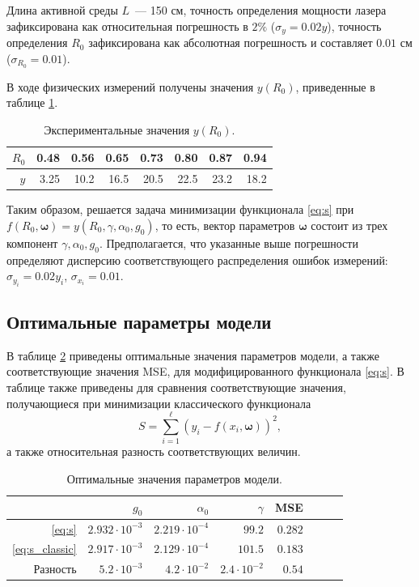 \documentclass[11pt,a4paper]{article}
\begin{document}
Длина активной среды $L$~--- 150 см, точность определения мощности лазера зафиксирована
как относительная погрешность в $2\%$ ($\sigma_y = 0.02y$), точность определения $R_0$
зафиксирована как абсолютная погрешность и составляет $0.01$ см ($\sigma_{R_0} = 0.01$).

В ходе физических измерений получены значения $y(R_0)$, приведенные в таблице \ref{tabl:measurements}.

\begin{table}[h]
  \caption{Экспериментальные значения $y(R_0)$.}
  \centering
  \begin{tabular}{| r | r | r | r | r | r | r | r |}
	\hline
	$R_0$	&	0.48	&	0.56	&	0.65	&	0.73	&	0.80	&	0.87	&	0.94	\\ \hline
	$y$		&	3.25	&	10.2	&	16.5	&	20.5	&	22.5	&	23.2	&	18.2	\\ \hline
  \end{tabular}
  \label{tabl:measurements}
\end{table}

Таким образом, решается задача минимизации функционала \eqref{eq:s} при
$f(R_0, \boldsymbol{\omega}) = y(R_0, \gamma, \alpha_0, g_0)$,
то есть, вектор параметров $\boldsymbol{\omega}$ состоит из трех компонент
$\gamma, \alpha_0, g_0$. Предполагается, что указанные выше погрешности определяют
дисперсию соответствующего распределения ошибок измерений: $\sigma_{y_i} = 0.02 y_i$, $\sigma_{x_i} = 0.01$.

\subsection{Оптимальные параметры модели}
В таблице \ref{tabl:res_coeffs} приведены оптимальные значения параметров модели, а также
соответствующие значения MSE, для модифицированного функционала \eqref{eq:s}. В таблице
также приведены для сравнения соответствующие значения, получающиеся при минимизации
классического функционала
\begin{equation}
  S = \sum_{i = 1}^\ell (y_i - f(x_i, \boldsymbol{\omega}))^2,
  \label{eq:s_classic}
\end{equation}
а также относительная разность соответствующих величин.

\begin{table}[h]
  \caption{Оптимальные значения параметров модели.}
  \centering
  \begin{tabular}{| r | r | r | r | r | r | r | r |}
	\hline
							& $g_0$					& $\alpha_0$			& $\gamma$				& MSE		\\ \hline
	\eqref{eq:s}			& $2.932 \cdot 10^{-3}$	& $2.219 \cdot 10^{-4}$	& $99.2$				& $0.282$	\\ \hline
	\eqref{eq:s_classic}	& $2.917 \cdot 10^{-3}$	& $2.129 \cdot 10^{-4}$	& $101.5$				& $0.183$	\\ \hline
	Разность				& $5.2 \cdot 10^{-3}$	& $4.2 \cdot 10^{-2}$	& $2.4 \cdot 10^{-2}$	& $0.54$	\\ \hline
  \end{tabular}
  \label{tabl:res_coeffs}
\end{table}
\end{document}
